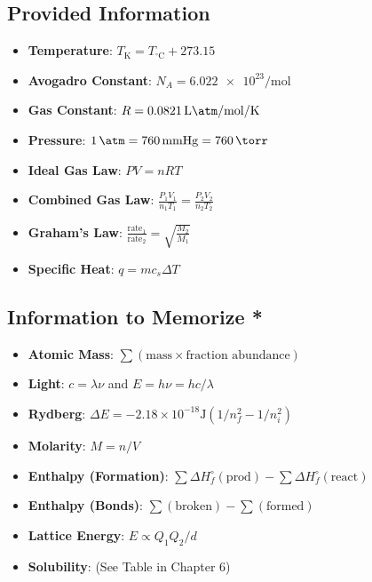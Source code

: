 \documentclass[11pt]{article}
\begin{document}
\subsection*{Provided Information}
\begin{itemize}
    \item \textbf{Temperature}: $T_{\si{\kelvin}} = T_{^\circ\text{C}} + 273.15$
    \item \textbf{Avogadro Constant}: $N_A = \num{6.022e23} \si{\per\mole}$
    \item \textbf{Gas Constant}: $R = \SI{0.0821}{\liter\atm\per\mole\per\kelvin}$
    \item \textbf{Pressure}: $\SI{1}{\atm} = \SI{760}{\mmHg} = \SI{760}{\torr}$
    \item \textbf{Ideal Gas Law}: $PV = nRT$
    \item \textbf{Combined Gas Law}: $\frac{P_1V_1}{n_1T_1} = \frac{P_2V_2}{n_2T_2}$
    \item \textbf{Graham's Law}: $\frac{\text{rate}_1}{\text{rate}_2} = \sqrt{\frac{M_2}{M_1}}$
    \item \textbf{Specific Heat}: $q = m c_s \Delta T$
\end{itemize}

\subsection*{Information to Memorize *}
\begin{itemize}
    \item \textbf{Atomic Mass}: $\sum (\text{mass} \times \text{fraction abundance})$
    \item \textbf{Light}: $c = \lambda \nu$ and $E = h\nu = hc/\lambda$
    \item \textbf{Rydberg}: $\Delta E = -2.18 \times 10^{-18} \si{\joule} (1/n_f^2 - 1/n_i^2)$
    \item \textbf{Molarity}: $M = n/V$
    \item \textbf{Enthalpy (Formation)}: $\sum \Delta H_f^\circ(\text{prod}) - \sum \Delta H_f^\circ(\text{react})$
    \item \textbf{Enthalpy (Bonds)}: $\sum (\text{broken}) - \sum (\text{formed})$
    \item \textbf{Lattice Energy}: $E \propto Q_1Q_2/d$
    \item \textbf{Solubility}: (See Table in Chapter 6)
\end{itemize}
\end{document}
